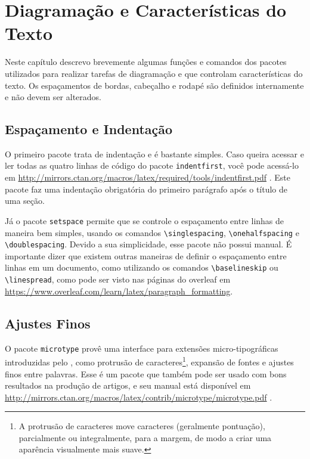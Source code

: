 \chapter{Diagramação e Características do Texto}\label{cap:diagramacao}

Neste capítulo descrevo brevemente algumas funções e comandos dos pacotes utilizados para realizar tarefas de diagramação e que controlam características do texto. Os espaçamentos de bordas, cabeçalho e rodapé são definidos internamente e não devem ser alterados.

\section{Espaçamento e Indentação}

O primeiro pacote trata de indentação e é bastante simples. Caso queira acessar e ler todas as quatro linhas de código do pacote \texttt{indentfirst}, você pode acessá-lo em \url{http://mirrors.ctan.org/macros/latex/required/tools/indentfirst.pdf} \parencite{indentfirst}. Este pacote faz uma indentação obrigatória do primeiro parágrafo após o título de uma seção.

Já o pacote \texttt{setspace} permite que se controle o espaçamento entre linhas de maneira bem simples, usando os comandos \texttt{\textbackslash singlespacing}, \texttt{\textbackslash onehalfspacing} e \texttt{\textbackslash doublespacing}. Devido a sua simplicidade, esse pacote não possui manual. É importante dizer que existem outras maneiras de definir o espaçamento entre linhas em um documento, como utilizando os comandos \texttt{\textbackslash baselineskip} ou \texttt{\textbackslash linespread}, como pode ser visto nas páginas do \gls{overleaf} em \url{https://www.overleaf.com/learn/latex/paragraph_formatting}.

\section{Ajustes Finos}
O pacote \texttt{microtype} provê uma interface para extensões micro-tipográficas introduzidas pelo , como protrusão de caracteres\footnote{A protrusão de caracteres move caracteres (geralmente pontuação), parcialmente ou integralmente, para a margem, de modo a criar uma aparência visualmente mais suave.}, expansão de fontes e ajustes finos entre palavras. Esse é um pacote que também pode ser usado com bons resultados na produção de artigos, e seu manual está disponível em \url{http://mirrors.ctan.org/macros/latex/contrib/microtype/microtype.pdf} \parencite{microtype}.

